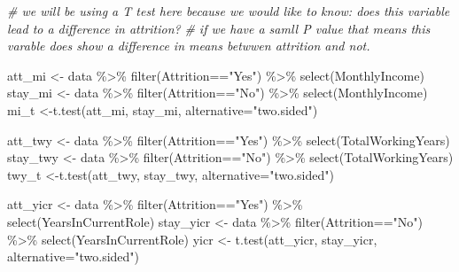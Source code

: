 \documentclass[
]{article}
\newenvironment{Shaded}{\begin{snugshade}}{\end{snugshade}}
\newcommand{\AttributeTok}[1]{\textcolor[rgb]{0.77,0.63,0.00}{#1}}
\newcommand{\CommentTok}[1]{\textcolor[rgb]{0.56,0.35,0.01}{\textit{#1}}}
\newcommand{\FunctionTok}[1]{\textcolor[rgb]{0.00,0.00,0.00}{#1}}
\newcommand{\NormalTok}[1]{#1}
\newcommand{\OtherTok}[1]{\textcolor[rgb]{0.56,0.35,0.01}{#1}}
\newcommand{\SpecialCharTok}[1]{\textcolor[rgb]{0.00,0.00,0.00}{#1}}
\newcommand{\StringTok}[1]{\textcolor[rgb]{0.31,0.60,0.02}{#1}}
\begin{document}
\begin{Shaded}
\begin{Highlighting}[]
\CommentTok{\# we will be using a T test here because we would like to know: does this variable lead to a difference in attrition?}
\CommentTok{\# if we have a samll P value that means this varable does show a difference in means betwwen attrition and not.}

\NormalTok{att\_mi }\OtherTok{\textless{}{-}}\NormalTok{ data }\SpecialCharTok{\%\textgreater{}\%} \FunctionTok{filter}\NormalTok{(Attrition}\SpecialCharTok{==}\StringTok{"Yes"}\NormalTok{) }\SpecialCharTok{\%\textgreater{}\%} \FunctionTok{select}\NormalTok{(MonthlyIncome)}
\NormalTok{stay\_mi }\OtherTok{\textless{}{-}}\NormalTok{ data }\SpecialCharTok{\%\textgreater{}\%} \FunctionTok{filter}\NormalTok{(Attrition}\SpecialCharTok{==}\StringTok{"No"}\NormalTok{) }\SpecialCharTok{\%\textgreater{}\%} \FunctionTok{select}\NormalTok{(MonthlyIncome)}
\NormalTok{mi\_t }\OtherTok{\textless{}{-}}\FunctionTok{t.test}\NormalTok{(att\_mi, stay\_mi, }\AttributeTok{alternative=}\StringTok{"two.sided"}\NormalTok{)}

\NormalTok{att\_twy }\OtherTok{\textless{}{-}}\NormalTok{ data }\SpecialCharTok{\%\textgreater{}\%} \FunctionTok{filter}\NormalTok{(Attrition}\SpecialCharTok{==}\StringTok{"Yes"}\NormalTok{) }\SpecialCharTok{\%\textgreater{}\%} \FunctionTok{select}\NormalTok{(TotalWorkingYears)}
\NormalTok{stay\_twy }\OtherTok{\textless{}{-}}\NormalTok{ data }\SpecialCharTok{\%\textgreater{}\%} \FunctionTok{filter}\NormalTok{(Attrition}\SpecialCharTok{==}\StringTok{"No"}\NormalTok{) }\SpecialCharTok{\%\textgreater{}\%} \FunctionTok{select}\NormalTok{(TotalWorkingYears)}
\NormalTok{twy\_t }\OtherTok{\textless{}{-}}\FunctionTok{t.test}\NormalTok{(att\_twy, stay\_twy, }\AttributeTok{alternative=}\StringTok{"two.sided"}\NormalTok{)}

\NormalTok{att\_yicr }\OtherTok{\textless{}{-}}\NormalTok{ data }\SpecialCharTok{\%\textgreater{}\%} \FunctionTok{filter}\NormalTok{(Attrition}\SpecialCharTok{==}\StringTok{"Yes"}\NormalTok{) }\SpecialCharTok{\%\textgreater{}\%} \FunctionTok{select}\NormalTok{(YearsInCurrentRole)}
\NormalTok{stay\_yicr }\OtherTok{\textless{}{-}}\NormalTok{ data }\SpecialCharTok{\%\textgreater{}\%} \FunctionTok{filter}\NormalTok{(Attrition}\SpecialCharTok{==}\StringTok{"No"}\NormalTok{) }\SpecialCharTok{\%\textgreater{}\%} \FunctionTok{select}\NormalTok{(YearsInCurrentRole)}
\NormalTok{yicr }\OtherTok{\textless{}{-}} \FunctionTok{t.test}\NormalTok{(att\_yicr, stay\_yicr, }\AttributeTok{alternative=}\StringTok{"two.sided"}\NormalTok{)}


\end{Highlighting}
\end{Shaded}
\end{document}
